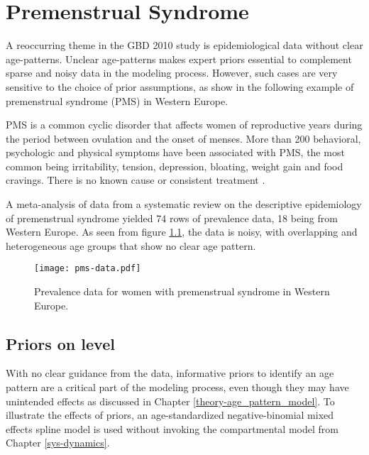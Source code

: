 \chapter{Premenstrual Syndrome}
\label{applications-priors_knots_select}

A reoccurring theme in the GBD 2010 study is epidemiological data without clear age-patterns.  Unclear age-patterns makes expert priors essential to complement sparse and noisy data in the modeling process.  However, such cases are very sensitive to the choice of prior assumptions, as show in the following example of premenstrual syndrome (PMS) in Western Europe.

PMS is a common cyclic disorder that affects women of reproductive years during the period between ovulation and the onset of menses.  More than 200 behavioral, psychologic and physical symptoms have been associated with PMS, the most common being irritability, tension, depression, bloating, weight gain and food cravings.  There is no known cause or consistent treatment \cite{dickerson_premenstrual_2003, singh_incidence_1998, goodale_alleviation_1990}.

A meta-analysis of data from a systematic review on the descriptive epidemiology of premenstrual syndrome yielded 74 rows of prevalence data, 18 being from Western Europe.  As seen from figure \ref{fig:app-pms_data}, the data is noisy, with overlapping and heterogeneous age groups that show no clear age pattern.

    \begin{figure}[h]
        \begin{center}
            \texttt{[image: pms-data.pdf]}
            \caption{Prevalence data for women with premenstrual syndrome in Western Europe.}
        \end{center}
        \label{fig:app-pms_data}
    \end{figure}

\section{Priors on level} \label{sec:app-priors on level}
With no clear guidance from the data, informative priors to identify an age pattern are a critical part of the modeling process, even though they may have unintended effects as discussed in Chapter \ref{theory-age_pattern_model}.  To illustrate the effects of priors, an age-standardized negative-binomial mixed effects spline model is used without invoking the compartmental model from Chapter \ref{sys-dynamics}.

